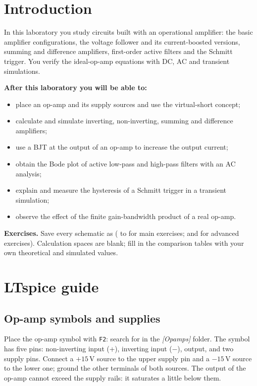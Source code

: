 
\section{Introduction}
In this laboratory you study circuits built with an operational amplifier: the basic amplifier configurations, the voltage follower and its current-boosted versions, summing and difference amplifiers, first-order active filters and the Schmitt trigger. You verify the ideal-op-amp equations with DC, AC and transient simulations.

\textbf{After this laboratory you will be able to:}
\begin{itemize}
  \item place an op-amp and its supply sources and use the virtual-short concept;
  \item calculate and simulate inverting, non-inverting, summing and difference amplifiers;
  \item use a BJT at the output of an op-amp to increase the output current;
  \item obtain the Bode plot of active low-pass and high-pass filters with an AC analysis;
  \item explain and measure the hysteresis of a Schmitt trigger in a transient simulation;
  \item observe the effect of the finite gain-bandwidth product of a real op-amp.
\end{itemize}

\textbf{Exercises.} Save every schematic as  ( to  for main exercises;  and  for advanced exercises). Calculation spaces are blank; fill in the comparison tables with your own theoretical and simulated values.

\section{LTspice guide}

\subsection{Op-amp symbols and supplies}
Place the op-amp symbol with \texttt{F2}: search for  in the \textit{[Opamps]} folder. The symbol has five pins: non-inverting input (+), inverting input ($-$), output, and two supply pins. Connect a $+15$\,V source to the upper supply pin and a $-15$\,V source to the lower one; ground the other terminals of both sources. The output of the op-amp cannot exceed the supply rails: it saturates a little below them.

